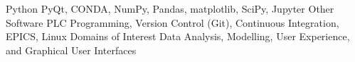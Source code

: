 \begin{cvskills}
    \cvskill
       {Python}
       {PyQt, CONDA, NumPy, Pandas, matplotlib, SciPy, Jupyter}
    \cvskill
       {Other Software}
       {PLC Programming, Version Control (Git), Continuous Integration, EPICS, Linux}
    \cvskill
       {Domains of Interest}
       {Data Analysis, Modelling, User Experience, and Graphical User Interfaces}
\end{cvskills}
